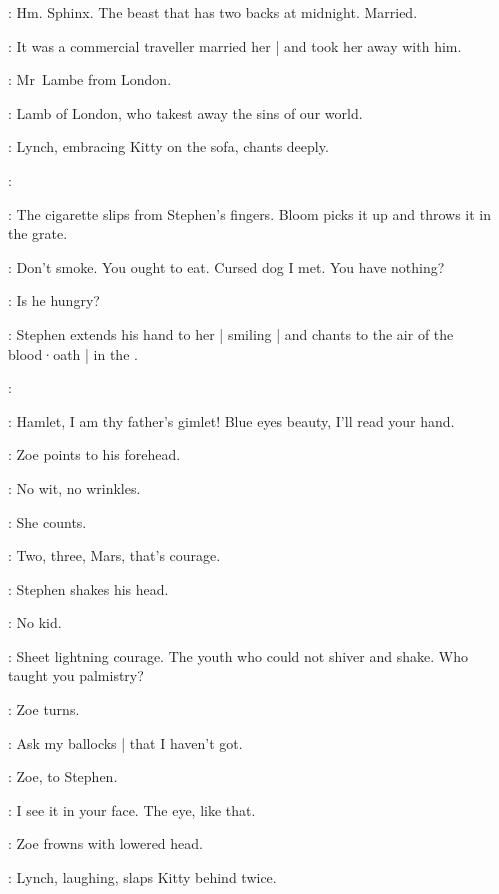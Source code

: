 \Stephen:
Hm.
Sphinx.
The beast that has two backs at midnight.
Married.

\Zoe:
It was a commercial traveller married her |
and took her away with him.

\Florry:
Mr~Lambe from London.

\Stephen:
Lamb of London,
who takest away the sins of our world.

:
Lynch,
embracing Kitty on the sofa,
chants deeply.

\Lynch:

:
The cigarette slips from Stephen's fingers.
Bloom picks it up and throws it in the grate.

\Bloom:
Don't smoke.
You ought to eat.
Cursed dog I met.
You have nothing?

\Zoe:
Is he hungry?

:
Stephen extends his hand to her |
smiling |
and chants to the air of the blood·oath |
in the .

\Stephen:
\begin{verse}
\end{verse}

\Zoe:
Hamlet,
I am thy father's gimlet!
Blue eyes beauty,
I'll read your hand.

:
Zoe points to his forehead.

\Zoe:
No wit,
no wrinkles.

:
She counts.

\Zoe:
Two,
three,
Mars,
that's courage.

:
Stephen shakes his head.

\Zoe:
No kid.

\Lynch:
Sheet lightning courage.
The youth who could not shiver and shake.
Who taught you palmistry?

:
Zoe turns.

\Zoe:
Ask my ballocks |
that I haven't got.

:
Zoe,
to Stephen.

\Zoe:
I see it in your face.
The eye,
like that.

:
Zoe frowns with lowered head.

:
Lynch,
laughing,
slaps Kitty behind twice.

